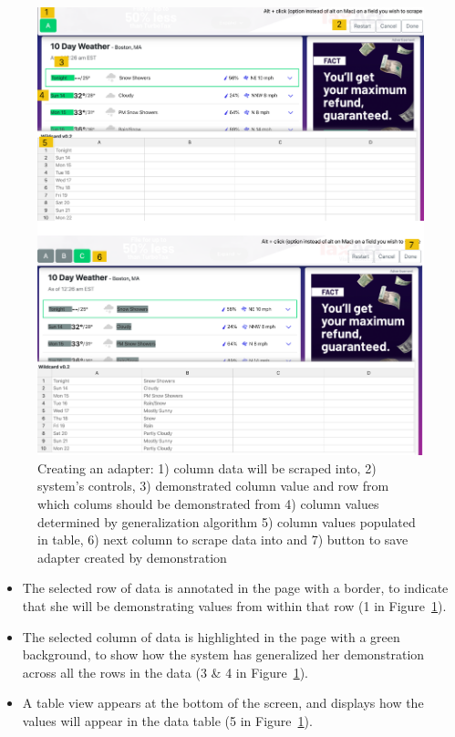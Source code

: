 \documentclass[sigconf,10pt]{acmart}
\providecommand{\tightlist}{%
  \setlength{\itemsep}{0pt}\setlength{\parskip}{0pt}}
\begin{document}
\begin{figure}
  \includegraphics[width=\textwidth]{media/creating.png}
  \caption{\label{fig:creating} Creating an adapter: 1) column data will be scraped into, 2) system's controls, 3) demonstrated column value and row from which colums should be demonstrated from 4) column values determined by generalization algorithm 5) column values populated in table, 6) next column to scrape data into and 7) button to save adapter created by demonstration}
\end{figure}

\begin{itemize}
\tightlist
\item
  The selected row of data is annotated in the page with a border, to
  indicate that she will be demonstrating values from within that row (1
  in Figure~\ref{fig:creating}).
\item
  The selected column of data is highlighted in the page with a green
  background, to show how the system has generalized her demonstration
  across all the rows in the data (3 \& 4 in Figure~\ref{fig:creating}).
\item
  A table view appears at the bottom of the screen, and displays how the
  values will appear in the data table (5 in Figure~\ref{fig:creating}).
\end{itemize}
\end{document}
